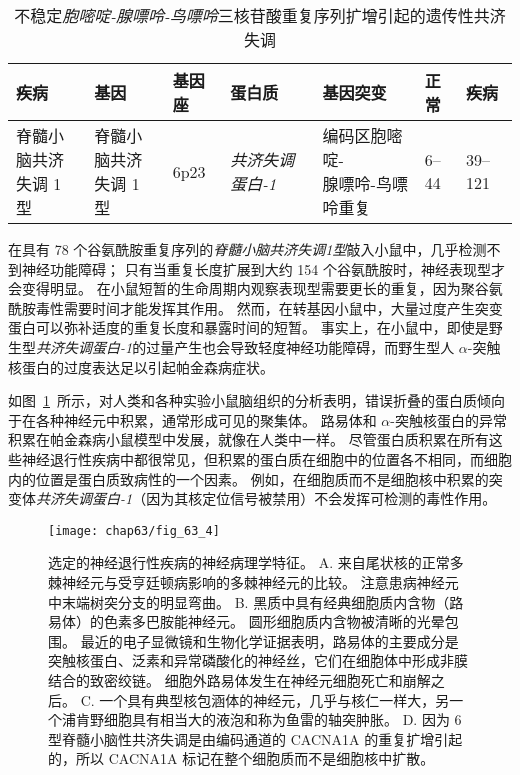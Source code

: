 \begin{table}[htbp]
	\caption{不稳定\textit{胞嘧啶-腺嘌呤-鸟嘌呤}三核苷酸重复序列扩增引起的遗传性共济失调} \label{tab:63_2} \centering
	\begin{tabular}{lllllll}
		\toprule
		疾病 & 基因 & 基因座 & 蛋白质 & 基因突变 & 正常 & 疾病 \\
		\midrule
		\makecell{脊髓小脑共济\\失调 1 型} & \makecell{脊髓小脑共济\\失调 1 型} & 6p23 & \textit{共济失调蛋白-1}   & \makecell{编码区胞嘧啶-\\腺嘌呤-鸟嘌呤重复} & 6–44 & 39–121 \\
		\bottomrule
	\end{tabular}
\end{table}


在具有 78 个谷氨酰胺重复序列的\textit{脊髓小脑共济失调1型}敲入小鼠中，几乎检测不到神经功能障碍；
只有当重复长度扩展到大约 154 个谷氨酰胺时，神经表现型才会变得明显。
在小鼠短暂的生命周期内观察表现型需要更长的重复，因为聚谷氨酰胺毒性需要时间才能发挥其作用。
然而，在转基因小鼠中，大量过度产生突变蛋白可以弥补适度的重复长度和暴露时间的短暂。
事实上，在小鼠中，即使是野生型\textit{共济失调蛋白-1}的过量产生也会导致轻度神经功能障碍，而野生型人 $\alpha$-突触核蛋白的过度表达足以引起帕金森病症状。


如图~\ref{fig:63_4}~所示，对人类和各种实验小鼠脑组织的分析表明，错误折叠的蛋白质倾向于在各种神经元中积累，通常形成可见的聚集体。
路易体和 $\alpha$-突触核蛋白的异常积累在帕金森病小鼠模型中发展，就像在人类中一样。
尽管蛋白质积累在所有这些神经退行性疾病中都很常见，但积累的蛋白质在细胞中的位置各不相同，而细胞内的位置是蛋白质致病性的一个因素。
例如，在细胞质而不是细胞核中积累的突变体\textit{共济失调蛋白-1}（因为其核定位信号被禁用）不会发挥可检测的毒性作用。


\begin{figure}[htbp]
	\centering
	\texttt{[image: chap63/fig\_63\_4]}
	\caption{选定的神经退行性疾病的神经病理学特征。
		A. 来自尾状核的正常多棘神经元与受亨廷顿病影响的多棘神经元的比较。
		注意患病神经元中末端树突分支的明显弯曲。
		B. 黑质中具有经典细胞质内含物（路易体）的色素多巴胺能神经元。
		圆形细胞质内含物被清晰的光晕包围。
		最近的电子显微镜和生物化学证据表明，路易体的主要成分是突触核蛋白、泛素和异常磷酸化的神经丝，它们在细胞体中形成非膜结合的致密绞链。
		细胞外路易体发生在神经元细胞死亡和崩解之后。
		C. 一个具有典型核包涵体的神经元，几乎与核仁一样大，另一个浦肯野细胞具有相当大的液泡和称为鱼雷的轴突肿胀。
		D. 因为 6 型脊髓小脑性共济失调是由编码通道的 CACNA1A 的重复扩增引起的，所以 CACNA1A 标记在整个细胞质而不是细胞核中扩散。}
	\label{fig:63_4}
\end{figure}


